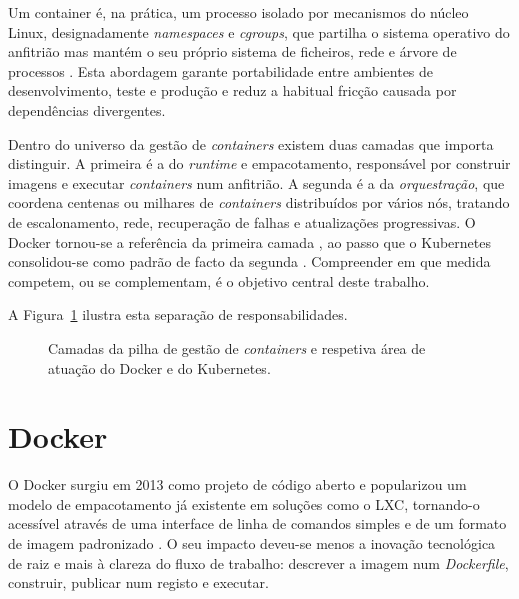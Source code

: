 \documentclass[conference]{IEEEtran}
\begin{document}
Um container é, na prática, um processo isolado por mecanismos do núcleo Linux, designadamente \textit{namespaces} e \textit{cgroups}, que partilha o sistema operativo do anfitrião mas mantém o seu próprio sistema de ficheiros, rede e árvore de processos \cite{bernstein2014}. Esta abordagem garante portabilidade entre ambientes de desenvolvimento, teste e produção e reduz a habitual fricção causada por dependências divergentes.

Dentro do universo da gestão de \textit{containers} existem duas camadas que importa distinguir. A primeira é a do \textit{runtime} e empacotamento, responsável por construir imagens e executar \textit{containers} num anfitrião. A segunda é a da \textit{orquestração}, que coordena centenas ou milhares de \textit{containers} distribuídos por vários nós, tratando de escalonamento, rede, recuperação de falhas e atualizações progressivas. O Docker tornou-se a referência da primeira camada \cite{merkel2014}, ao passo que o Kubernetes consolidou-se como padrão de facto da segunda \cite{burns2016}. Compreender em que medida competem, ou se complementam, é o objetivo central deste trabalho.

A Figura~\ref{fig:stack} ilustra esta separação de responsabilidades.

\begin{figure}[t]
\centering
{}
\caption{Camadas da pilha de gestão de \textit{containers} e respetiva área de atuação do Docker e do Kubernetes.}
\label{fig:stack}
\end{figure}

\section{Docker}
O Docker surgiu em 2013 como projeto de código aberto e popularizou um modelo de empacotamento já existente em soluções como o LXC, tornando-o acessível através de uma interface de linha de comandos simples e de um formato de imagem padronizado \cite{merkel2014}. O seu impacto deveu-se menos a inovação tecnológica de raiz e mais à clareza do fluxo de trabalho: descrever a imagem num \textit{Dockerfile}, construir, publicar num registo e executar.
\end{document}
